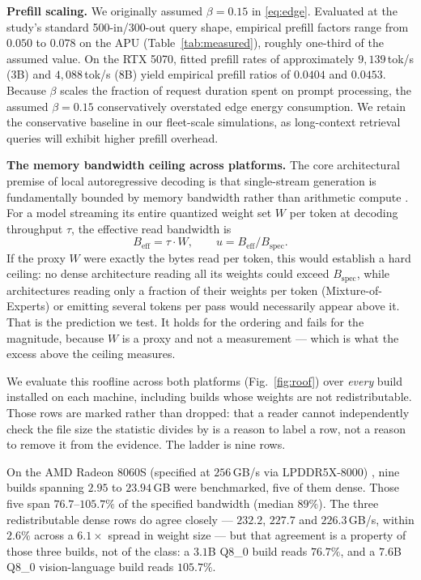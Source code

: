 \documentclass[conference]{IEEEtran}
\begin{document}
\textbf{Prefill scaling.}
We originally assumed $\beta=0.15$ in \eqref{eq:edge}. Evaluated at the study's
standard 500-in/300-out query shape, empirical prefill factors range from
$0.050$ to $0.078$ on the APU (Table~\ref{tab:measured}), roughly one-third of
the assumed value. On the RTX 5070, fitted prefill rates of approximately
$9{,}139$\,tok/s (3B) and $4{,}088$\,tok/s (8B) yield empirical prefill ratios of
$0.0404$ and $0.0453$. Because $\beta$ scales the fraction of request duration
spent on prompt processing, the assumed $\beta=0.15$ conservatively overstated
edge energy consumption. We retain the conservative baseline in our fleet-scale
simulations, as long-context retrieval queries will exhibit higher prefill
overhead.

\textbf{The memory bandwidth ceiling across platforms.}
The core architectural premise of local autoregressive decoding is that
single-stream generation is fundamentally bounded by memory bandwidth rather
than arithmetic compute \cite{williams2009roofline}. For a model streaming its
entire quantized weight set $W$ per token at decoding throughput $\tau$, the
effective read bandwidth is
\begin{equation}
B_{\text{eff}} = \tau \cdot W, \qquad u = B_{\text{eff}} / B_{\text{spec}}.
\label{eq:beff}
\end{equation}
If the proxy $W$ were exactly the bytes read per token, this would establish
a hard ceiling: no dense architecture reading all its weights could exceed
$B_{\text{spec}}$, while architectures reading only a fraction of their
weights per token (Mixture-of-Experts) or emitting several tokens per pass
would necessarily appear above it. That is the prediction we test. It holds
for the ordering and fails for the magnitude, because $W$ is a proxy and
not a measurement --- which is what the excess above the ceiling measures.

We evaluate this roofline across both platforms (Fig.~\ref{fig:roof}) over
\emph{every} build installed on each machine, including builds whose weights
are not redistributable. Those rows are marked rather than dropped: that a
reader cannot independently check the file size the statistic divides by is
a reason to label a row, not a reason to remove it from the evidence. The
ladder is nine rows.

On the AMD Radeon 8060S (specified at $256$\,GB/s via LPDDR5X-8000)
\cite{amd_strix2025}, nine builds spanning $2.95$ to $23.94$\,GB were
benchmarked, five of them dense. Those five span
$\mathbf{76.7}$--$\mathbf{105.7\%}$ of the specified bandwidth (median $89\%$).
The three redistributable dense rows do agree closely --- $232.2$, $227.7$ and
$226.3$\,GB/s, within $2.6\%$ across a $6.1\times$ spread in weight size
\cite{ministral32026,museglimmer2026} --- but that agreement is a property of
those three builds, not of the class: a $3.1$B Q8\_0 build reads $76.7\%$, and a
$7.6$B Q8\_0 vision-language build reads $\mathbf{105.7\%}$.
\end{document}

